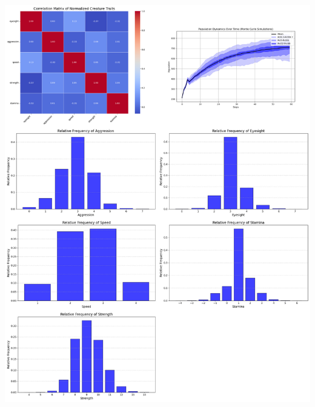 \documentclass{article}
\begin{document}
\begin{center}
    \includegraphics[scale=0.21]{tests/1.9.jpg}
\end{center}
\end{document}
